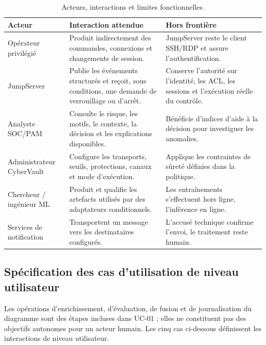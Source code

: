 \documentclass[11pt,a4paper,oneside]{report}
\theoremstyle{definition}
\theoremstyle{plain}
\begin{document}
\begin{table}[H]\centering\small
\begin{tabularx}{\textwidth}{p{2.7cm} X X}\toprule
\textbf{Acteur} & \textbf{Interaction attendue} & \textbf{Hors frontière} \\\midrule
Opérateur privilégié & Produit indirectement des commandes, connexions et changements de session. & JumpServer reste le client SSH/RDP et assure l'authentification. \\
JumpServer & Publie les événements structurés et reçoit, sous conditions, une demande de verrouillage ou d'arrêt. & Conserve l'autorité sur l'identité, les ACL, les sessions et l'exécution réelle du contrôle. \\
Analyste SOC/PAM & Consulte le risque, les motifs, le contexte, la décision et les explications disponibles. & Bénéficie d'indices d'aide à la décision pour investiguer les anomalies. \\
Administrateur CyberVault & Configure les transports, seuils, protections, canaux et mode d'exécution. & Applique les contraintes de sûreté définies dans la politique. \\
Chercheur / ingénieur ML & Produit et qualifie les artefacts utilisés par des adaptateurs conditionnels. & Les entraînements s'effectuent hors ligne, l'inférence en ligne. \\
Services de notification & Transportent un message vers les destinataires configurés. & L'accusé technique confirme l'envoi, le traitement reste humain. \\\bottomrule
\end{tabularx}
\caption{Acteurs, interactions et limites fonctionnelles.}
\label{tab:impl-actors}
\end{table}

\subsection{Spécification des cas d'utilisation de niveau utilisateur}

Les opérations d'enrichissement, d'évaluation, de fusion et de journalisation
du diagramme sont des étapes incluses dans UC-01 ; elles ne constituent pas
des objectifs autonomes pour un acteur humain. Les cinq cas ci-dessous
définissent les interactions de niveau utilisateur.
\end{document}
